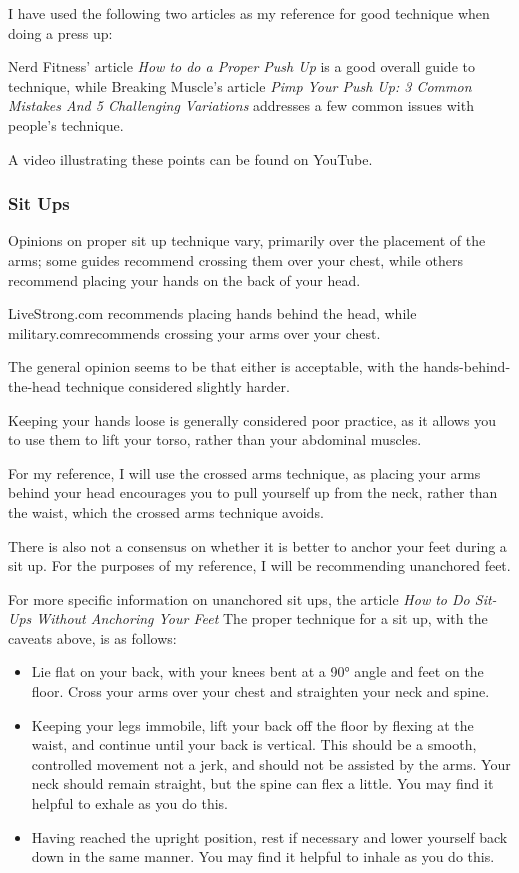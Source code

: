 \documentclass[a4paper]{article}
\begin{document}
I have used the following two articles as my reference for good technique when doing a press up:

Nerd Fitness' article \textit{How to do a Proper Push Up}\cite{bgref16}
is a good overall guide to technique, while Breaking Muscle's article \textit{Pimp Your Push Up: 3 Common Mistakes And 5 Challenging Variations}\cite{bgref17} addresses a few common issues with people's technique.

A video illustrating these points can be found on YouTube.\cite{bgref18}

\subsubsection{Sit Ups}

Opinions on proper sit up technique vary, primarily over the placement of the arms; some guides recommend crossing them over your chest, while others recommend placing your hands on the back of your head. 

LiveStrong.com\cite{bgref19} recommends placing hands behind the head, while military.com\cite{bgref20}recommends crossing your arms over your chest. 

The general opinion seems to be that either is acceptable, with the hands-behind-the-head technique considered slightly harder\cite{bgref21}.

Keeping your hands loose is generally considered poor practice, as it allows you to use them to lift your torso, rather than your abdominal muscles. 

For my reference, I will use the crossed arms technique, as placing your arms behind your head encourages you to pull yourself up from the neck, rather than the waist, which the crossed arms technique avoids.

There is also not a consensus on whether it is better to anchor your feet during a sit up. For the purposes of my reference, I will be recommending unanchored feet. 

For more specific information on unanchored sit ups, the article \textit{How to Do Sit-Ups Without Anchoring Your Feet}\cite{bgref22}
The proper technique for a sit up, with the caveats above, is as follows:

\begin{itemize}
    \item Lie flat on your back, with your knees bent at a 90° angle and feet on the floor. Cross your arms over your chest and straighten your neck and spine.
    \item Keeping your legs immobile, lift your back off the floor by flexing at the waist, and continue until your back is vertical. This should be a smooth, controlled movement not a jerk, and should not be assisted by the arms. Your neck should remain straight, but the spine can flex a little. You may find it helpful to exhale as you do this.
    \item Having reached the upright position, rest if necessary and lower yourself back down in the same manner. You may find it helpful to inhale as you do this.
\end{itemize}
\end{document}
